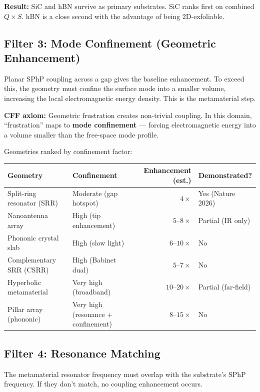 \documentclass[11pt, a4paper]{article}
\begin{document}
\textbf{Result:} SiC and hBN survive as primary substrates.
SiC ranks first on combined $Q \times S$. hBN is a close
second with the advantage of being 2D-exfoliable.

\subsection{Filter 3: Mode Confinement (Geometric Enhancement)}

Planar SPhP coupling across a gap gives the baseline
enhancement. To exceed this, the geometry must confine the
surface mode into a smaller volume, increasing the local
electromagnetic energy density. This is the metamaterial
step.

\textbf{CFF axiom:} Geometric frustration creates non-trivial
coupling. In this domain, ``frustration'' maps to
\textbf{mode confinement} --- forcing electromagnetic energy
into a volume smaller than the free-space mode profile.

Geometries ranked by confinement factor:

\begin{center}
\begin{tabular}{@{}llrl@{}}
\toprule
\textbf{Geometry} & \textbf{Confinement} &
  \textbf{Enhancement (est.)} & \textbf{Demonstrated?} \\
\midrule
Split-ring resonator (SRR) & Moderate (gap hotspot) &
  $4\times$ & Yes (Nature 2026) \\
Nanoantenna array & High (tip enhancement) &
  $5$--$8\times$ & Partial (IR only) \\
Phononic crystal slab & High (slow light) &
  $6$--$10\times$ & \textcolor{nm-orange}{No} \\
Complementary SRR (CSRR) & High (Babinet dual) &
  $5$--$7\times$ & \textcolor{nm-orange}{No} \\
Hyperbolic metamaterial & Very high (broadband) &
  $10$--$20\times$ & Partial (far-field) \\
Pillar array (phononic) & Very high (resonance + confinement) &
  $8$--$15\times$ & \textcolor{nm-orange}{No} \\
\bottomrule
\end{tabular}
\end{center}

\subsection{Filter 4: Resonance Matching}

The metamaterial resonator frequency must overlap with the
substrate's SPhP frequency. If they don't match, no coupling
enhancement occurs.
\end{document}
